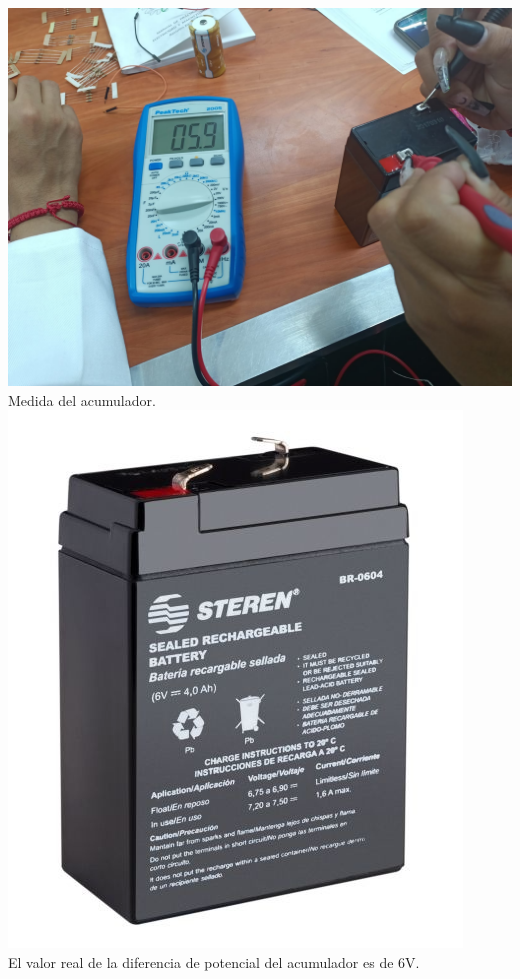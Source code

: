 \documentclass[10pt]{article}
\begin{document}
\begin{multicols}{2}
\begin{center}
	\includegraphics[scale = 0.1]{Imagenes/Fotos/Acumulador.jpeg}\\
	Medida del acumulador.\\
	\includegraphics[scale = .5]{Imagenes/Fotos/Real.PNG}\\
	El valor real de la diferencia de potencial del acumulador es de 6V.
\end{center}


\end{multicols}
\end{document}
